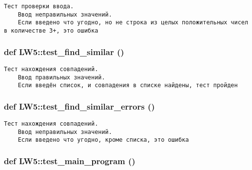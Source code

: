 \footnotesize\begin{verbatim}Тест проверки ввода.
    Ввод неправильных значений.
    Если введено что угодно, но не строка из целых положительных чисел в количестве 3+, это ошибка\end{verbatim}
\normalsize
 \hypertarget{namespace_l_w5_cc429e4a26de905f6b164b725d97fb1f}{
\subsubsection[{test\_\-find\_\-similar}]{\setlength{\rightskip}{0pt plus 5cm}def LW5::test\_\-find\_\-similar ()}}
\label{namespace_l_w5_cc429e4a26de905f6b164b725d97fb1f}




\footnotesize\begin{verbatim}Тест нахождения совпадений.
    Ввод правильных значений.
    Если введён список, и совпадения в списке найдены, тест пройден\end{verbatim}
\normalsize
 \hypertarget{namespace_l_w5_db1e3344370efc18d46bd9ca47552456}{
\subsubsection[{test\_\-find\_\-similar\_\-errors}]{\setlength{\rightskip}{0pt plus 5cm}def LW5::test\_\-find\_\-similar\_\-errors ()}}
\label{namespace_l_w5_db1e3344370efc18d46bd9ca47552456}




\footnotesize\begin{verbatim}Тест нахождения совпадений.
    Ввод неправильных значений.
    Если введено что угодно, кроме списка, это ошибка\end{verbatim}
\normalsize
 \hypertarget{namespace_l_w5_36f7970fbe6df884e3cde515e595d471}{
\subsubsection[{test\_\-main\_\-program}]{\setlength{\rightskip}{0pt plus 5cm}def LW5::test\_\-main\_\-program ()}}
\label{namespace_l_w5_36f7970fbe6df884e3cde515e595d471}




